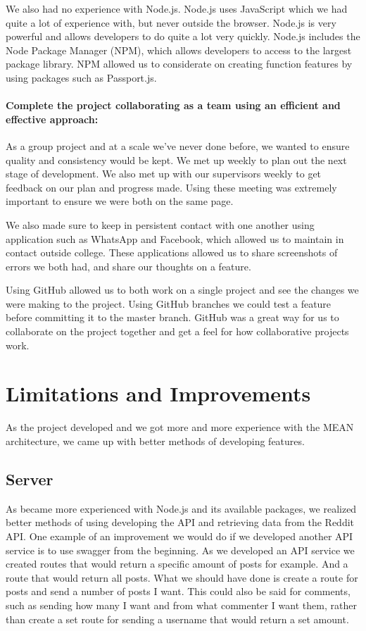 We also had no experience with Node.js. Node.js uses JavaScript which we had quite a lot of experience with, but never outside the browser. Node.js is very powerful and allows developers to do quite a lot very quickly. Node.js includes the Node Package Manager (NPM), which allows developers to access to the largest package library. NPM allowed us to considerate on creating function features by using packages such as Passport.js.

\paragraph{Complete  the  project  collaborating  as  a  team  using  an  efficient  and effective approach:}
As a group project and at a scale we've never done before, we wanted to ensure quality  and consistency would be kept. We met up weekly to plan out the next stage of development. We also met up with our supervisors weekly to get feedback on our plan and progress made. Using these meeting was extremely important to ensure we were both on the same page.

We also made sure to keep in persistent contact with one another using application such as WhatsApp and Facebook, which allowed us to maintain in contact outside college. These applications allowed us to share screenshots of errors we both had, and share our thoughts on a feature.

Using GitHub allowed us to both work on a single project and see the changes we were making to the project. Using GitHub branches we could test a feature before committing it to the master branch. GitHub was a great way for us to collaborate on the project together and get a feel for how collaborative projects work.

\section{Limitations and Improvements}
As the project developed and we got more and more experience with the MEAN architecture, we came up with better methods of developing features. 

\subsection{Server}
As became more experienced with Node.js and its available packages, we realized better methods of using developing the API and retrieving data from the Reddit API. One example of an improvement we would do if we developed another API service is to use swagger from the beginning. As we developed an API service we created routes that would return a specific amount of posts for example. And a route that would return all posts. What we should have done is create a route for posts and send a number of posts I want. This could also be said for comments, such as sending how many I want and from what commenter I want them, rather than create a set route for sending a username that would return a set amount.

